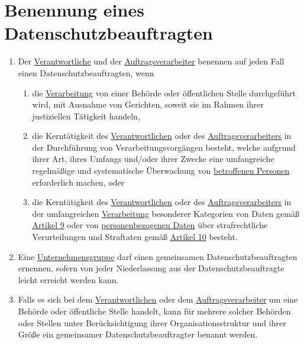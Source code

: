 \chapter{Benennung eines Datenschutzbeauftragten}
\label{ch:37}


\begin{enumerate}

  \item Der \hyperref[itm:04-7]{Verantwortliche} und der \hyperref[itm:04-8]{Auftragsverarbeiter} benennen auf jeden
   Fall einen Datenschutzbeauftragten, wenn%
  \label{itm:37-1}

  \begin{enumerate}
  
    \item die \hyperref[itm:04-2]{Verarbeitung} von einer Behörde oder öffentlichen Stelle durchgeführt wird, mit
     Ausnahme von Gerichten, soweit sie im Rahmen ihrer justiziellen Tätigkeit handeln,%
    \label{itm:37-1a}

    \item die Kerntätigkeit des \hyperref[itm:04-7]{Verantwortlichen} oder des \hyperref[itm:04-8]
     {Auftragsverarbeiters} in der Durchführung von Verarbeitungsvorgängen besteht, welche aufgrund ihrer Art, ihres
     Umfangs und/oder ihrer Zwecke eine umfangreiche regelmäßige und systematische Überwachung von \hyperref[itm:04-1]
     {betroffenen Personen} erforderlich machen, oder%
    \label{itm:37-1b}

    \item die Kerntätigkeit des \hyperref[itm:04-7]{Verantwortlichen} oder des \hyperref[itm:04-8]
     {Auftragsverarbeiters} in der umfangreichen \hyperref[itm:04-2]{Verarbeitung} besonderer Kategorien von Daten
     gemäß \hyperref[ch:9]{Artikel 9} oder von \hyperref[itm:04-1]{personenbezogenen Daten} über strafrechtliche
     Verurteilungen und Straftaten gemäß \hyperref[ch:10]{Artikel 10} besteht.%
    \label{itm:37-1c}

  \end{enumerate}

  \item Eine \hyperref[itm:04-19]{Unternehmensgruppe} darf einen gemeinsamen Datenschutzbeauftragten ernennen, sofern
   von jeder Niederlassung aus der Datenschutzbeauftragte leicht erreicht werden kann.%
  \label{itm:37-2}

  \item Falls es sich bei dem \hyperref[itm:04-7]{Verantwortlichen} oder dem \hyperref[itm:04-8]{Auftragsverarbeiter} um
   eine Behörde oder öffentliche Stelle handelt, kann für mehrere solcher Behörden oder Stellen unter Berücksichtigung
   ihrer Organisationsstruktur und ihrer Größe ein gemeinsamer Datenschutzbeauftragter benannt werden.%
  \label{itm:37-3}


\end{enumerate}

